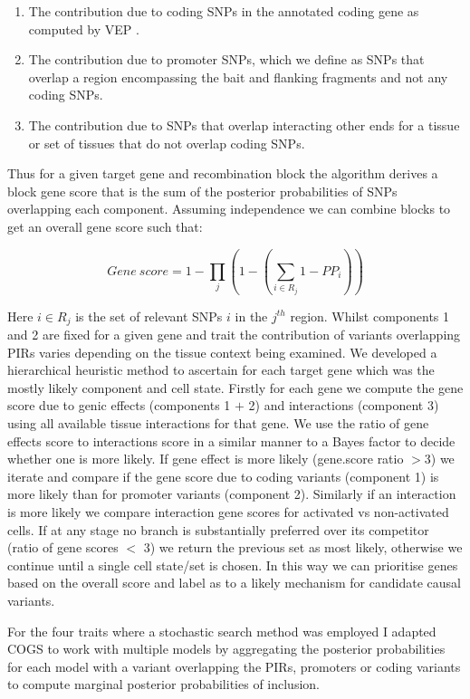 \documentclass[a4paper,11pt]{report}
\begin{document}
\begin{enumerate}
\item The contribution due to coding SNPs in the annotated coding gene as computed by VEP .
\item The contribution due to promoter SNPs, which we define as SNPs that overlap a region encompassing the bait and flanking  fragments and not any coding SNPs.
\item The contribution due to SNPs that overlap interacting other ends for a tissue or set of tissues that do not overlap coding SNPs. 
\end{enumerate}

Thus for a given target gene and recombination block the algorithm derives a block gene score that is the sum of the posterior probabilities of SNPs overlapping each component. Assuming independence we can combine blocks to get an overall gene score such that:

\begin{equation}
  Gene\ score = 1- \prod_j  \left(1-\left(\sum_{i \in R_j} 1-PP_i \right) \right)
\end{equation}

Here $i \in R_j$ is the set of relevant SNPs $i$ in the $j^{th}$ region. Whilst components 1 and 2 are fixed for a given gene and trait the contribution of variants overlapping PIRs varies depending on the tissue context being examined. We developed a hierarchical heuristic method to ascertain for each target gene which was the mostly likely component and cell state. Firstly for each gene we compute the gene score due to genic effects (components 1 $+$ 2) and interactions (component 3) using all available tissue interactions for that gene. We use the ratio of gene effects score to interactions score in a similar manner to a Bayes factor to decide whether one is more likely. If gene effect is more likely (gene.score ratio $>$3) we iterate and compare if the gene score due to coding variants (component 1) is more likely than for promoter variants (component 2). Similarly if an interaction is more likely we compare interaction gene scores for activated vs non-activated cells. If at any stage no branch is substantially preferred over its competitor (ratio of gene scores $<$ 3) we return the previous set as most likely, otherwise we continue until a single cell state/set is chosen. In this way we can prioritise genes based on the overall score and label as to a likely mechanism for candidate causal variants.

For the four traits where a stochastic search method was employed I adapted COGS to work with multiple models by aggregating the posterior probabilities for each model with a variant overlapping the PIRs, promoters or coding variants to compute marginal posterior probabilities of inclusion.
\end{document}

